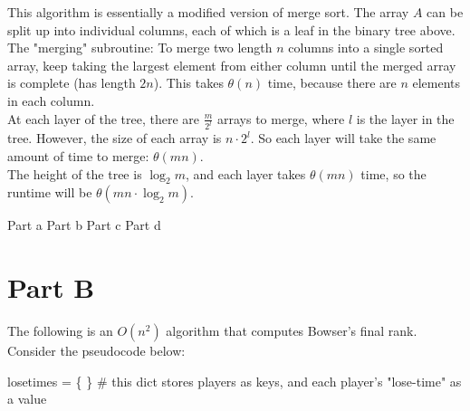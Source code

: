 \documentclass[12pt,twoside]{article}
\begin{document}
\begin{problems}
\begin{problemparts}
\bigskip
\bigskip

This algorithm is essentially a modified version of merge sort. The array $A$ can be split up into individual columns, each of which is a leaf in the binary tree above. \\

The "merging" subroutine: To merge two length $n$ columns into a single sorted array, keep taking the largest element from either column until the merged array is complete (has length $2n$). This takes $\theta(n)$ time, because there are $n$ elements in each column. \\

At each layer of the tree, there are $\frac{m}{2^l}$ arrays to merge, where $l$ is the layer in the tree. However, the size of each array is $n \cdot 2^l$. So each layer will take the same amount of time to merge: $\theta(mn)$. \\

The height of the tree is $\log_2 m$, and each layer takes $\theta(mn)$ time, so the runtime will be $\theta(mn \cdot \log_2 m)$.



\end{problemparts}


\problem  %

\begin{problemparts}
\problempart Part a %
\problempart Part b %
\problempart Part c %
\problempart Part d %
\end{problemparts}

\section*{Part B}

\problem
\begin{problemparts}
\problempart The following is an $O(n^2)$ algorithm that computes Bowser's final rank. Consider the pseudocode below:
\bigskip

losetimes =  \{ \}  \# this dict stores players as keys, and each player's "lose-time" as a value


\end{problemparts}
\end{problems}
\end{document}

